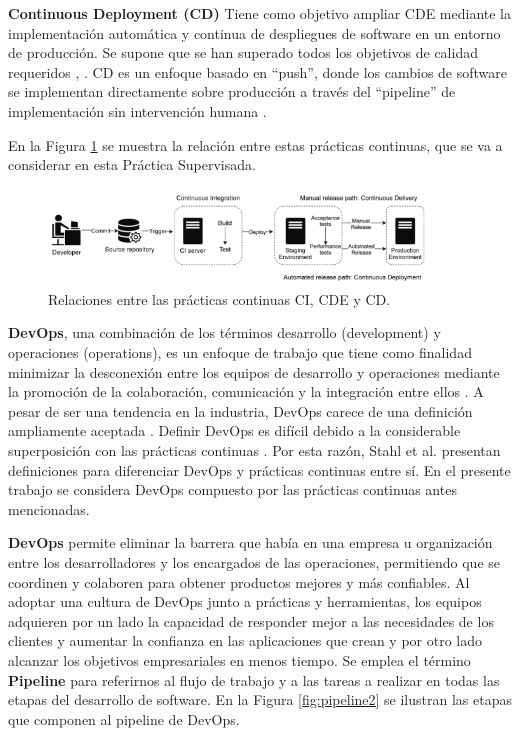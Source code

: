 \textbf{Continuous Deployment (CD)} Tiene como objetivo ampliar CDE mediante la implementación automática y continua de despliegues de software en un entorno de producción. Se supone que se han superado todos los objetivos de calidad requeridos \cite{7465693}, \cite{Shahin2017ContinuousID}. CD es un enfoque basado en “push”, donde los cambios de software se implementan directamente sobre producción a través del “pipeline” de implementación sin intervención humana \cite{Schermann}. 

En la Figura \ref{fig:pipeline1} se muestra la relación entre estas prácticas continuas, que se va a considerar en esta Práctica Supervisada.

\begin{figure}[htp]
    \centering
    \includegraphics[width=0.9\textwidth]{fig/pipeline1.png}
    \caption{Relaciones entre las prácticas continuas CI, CDE y CD.}
    \label{fig:pipeline1}
\end{figure}
\textbf{DevOps}, una combinación de los términos desarrollo (development) y operaciones (operations), es un enfoque de trabajo que tiene como finalidad  minimizar la desconexión entre los equipos de desarrollo y operaciones mediante la promoción de la colaboración, comunicación y la integración entre ellos \cite{BassDevOpsA2015}. A pesar de ser una tendencia en la industria, DevOps carece de una definición ampliamente aceptada \cite{10.1145/3359981}. Definir DevOps es difícil debido a la considerable superposición con las prácticas continuas \cite{Sthl2017ContinuousPA}. Por esta razón, Stahl et al. \cite{Sthl2017ContinuousPA} presentan definiciones para diferenciar DevOps y prácticas continuas entre sí. En el presente trabajo se considera DevOps compuesto por las prácticas continuas antes mencionadas.

\textbf{DevOps} permite eliminar la barrera que había en una empresa u organización entre los desarrolladores  y  los encargados de las operaciones, permitiendo que se coordinen y colaboren para obtener productos mejores y más confiables. Al adoptar una cultura de DevOps junto a prácticas y herramientas, los equipos adquieren por un lado la  capacidad de responder mejor a las necesidades de los clientes y aumentar la confianza en las aplicaciones que crean y por otro lado alcanzar los objetivos empresariales en menos tiempo. Se emplea el término \textbf{Pipeline} para referirnos al flujo de trabajo y a las tareas a realizar en todas las etapas del desarrollo de software. En la Figura \ref{fig:pipeline2} se ilustran las etapas que componen al pipeline de DevOps.

